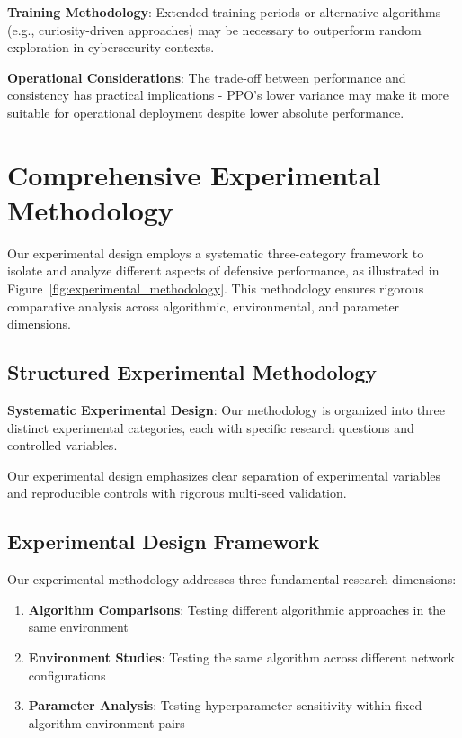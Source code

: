 \documentclass[12pt,oneside]{article}
\begin{document}
\textbf{Training Methodology}: Extended training periods or alternative algorithms (e.g., curiosity-driven approaches) may be necessary to outperform random exploration in cybersecurity contexts.

\textbf{Operational Considerations}: The trade-off between performance and consistency has practical implications - PPO's lower variance may make it more suitable for operational deployment despite lower absolute performance.

\section{Comprehensive Experimental Methodology}

Our experimental design employs a systematic three-category framework to isolate and analyze different aspects of defensive performance, as illustrated in Figure~\ref{fig:experimental_methodology}. This methodology ensures rigorous comparative analysis across algorithmic, environmental, and parameter dimensions.



\subsection{Structured Experimental Methodology}

\textbf{Systematic Experimental Design}: Our methodology is organized into three distinct experimental categories, each with specific research questions and controlled variables.

Our experimental design emphasizes clear separation of experimental variables and reproducible controls with rigorous multi-seed validation.

\subsection{Experimental Design Framework}

Our experimental methodology addresses three fundamental research dimensions:

\begin{enumerate}
\item \textbf{Algorithm Comparisons}: Testing different algorithmic approaches in the same environment
\item \textbf{Environment Studies}: Testing the same algorithm across different network configurations  
\item \textbf{Parameter Analysis}: Testing hyperparameter sensitivity within fixed algorithm-environment pairs
\end{enumerate}
\end{document}
